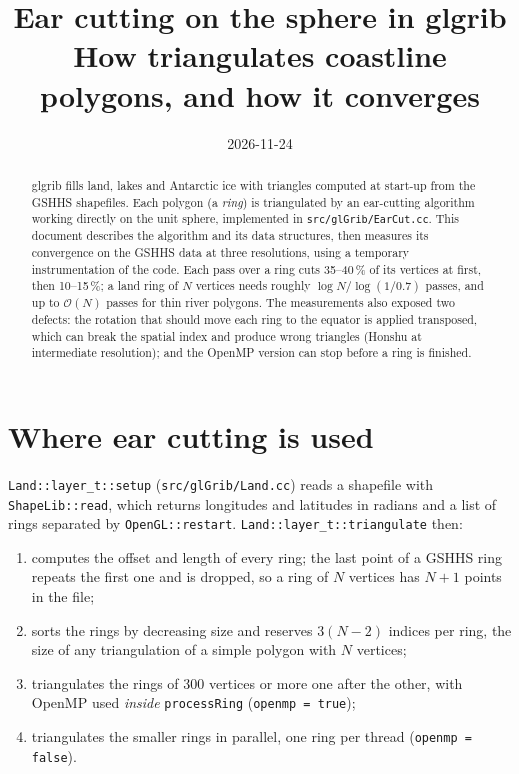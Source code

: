 \documentclass[11pt,a4paper]{article}
\title{Ear cutting on the sphere in glgrib\\[0.3em]
\large How \code{EarCut::processRing} triangulates coastline polygons, and how it converges}
\author{}
\date{2026-11-24}
\newcommand{\code}[1]{\texttt{#1}}
\begin{document}
\sloppy
\maketitle

\begin{abstract}
glgrib fills land, lakes and Antarctic ice with triangles computed at start-up from the GSHHS
shapefiles. Each polygon (a \emph{ring}) is triangulated by an ear-cutting algorithm working
directly on the unit sphere, implemented in \code{src/glGrib/EarCut.cc}. This document describes
the algorithm and its data structures, then measures its convergence on the GSHHS data at three
resolutions, using a temporary instrumentation of the code. Each pass over a ring cuts 35--40\,\%
of its vertices at first, then 10--15\,\%; a land ring of $N$ vertices needs roughly
$\log N/\log(1/0.7)$ passes, and up to $\mathcal{O}(N)$ passes for thin river polygons.
The measurements also exposed two defects: the rotation that should move each ring to the equator
is applied transposed, which can break the spatial index and produce wrong triangles (Honshu at
intermediate resolution); and the OpenMP version can stop before a ring is finished.
\end{abstract}

\tableofcontents

\section{Where ear cutting is used}

\code{Land::layer\_t::setup} (\code{src/glGrib/Land.cc}) reads a shapefile with
\code{ShapeLib::read}, which returns longitudes and latitudes in radians and a list of rings
separated by \code{OpenGL::restart}. \code{Land::layer\_t::triangulate} then:

\begin{enumerate}
\item computes the offset and length of every ring; the last point of a GSHHS ring repeats the
  first one and is dropped, so a ring of $N$ vertices has $N+1$ points in the file;
\item sorts the rings by decreasing size and reserves $3(N-2)$ indices per ring, the size of any
  triangulation of a simple polygon with $N$ vertices;
\item triangulates the rings of 300 vertices or more one after the other, with OpenMP used
  \emph{inside} \code{processRing} (\code{openmp = true});
\item triangulates the smaller rings in parallel, one ring per thread (\code{openmp = false}).
\end{enumerate}
\end{document}
